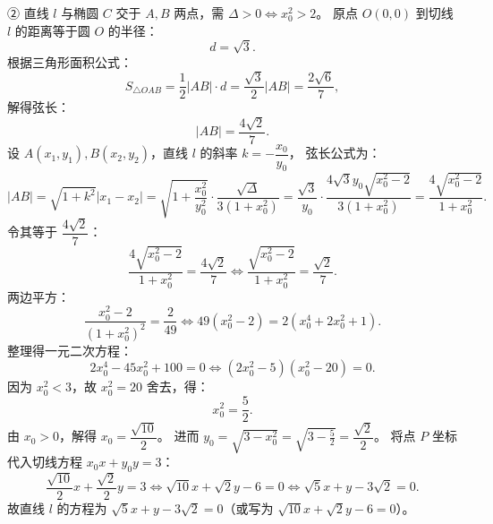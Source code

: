 \begin{answer}
② 直线 $l$ 与椭圆 $C$ 交于 $A, B$ 两点，需 $\Delta > 0 \iff x_0^2 > 2$。
原点 $O(0, 0)$ 到切线 $l$ 的距离等于圆 $O$ 的半径：
\nopagebreak[4]
\[d = \sqrt{3}.\]
根据三角形面积公式：
\nopagebreak[4]
\[S_{\triangle OAB} = \frac{1}{2} |AB| \cdot d = \frac{\sqrt{3}}{2} |AB| = \frac{2\sqrt{6}}{7},\]
解得弦长：
\nopagebreak[4]
\[|AB| = \frac{4\sqrt{2}}{7}.\]
设 $A(x_1, y_1), B(x_2, y_2)$，直线 $l$ 的斜率 $k = -\dfrac{x_0}{y_0}$，
弦长公式为：
\nopagebreak[4]
\[|AB| = \sqrt{1 + k^2} |x_1 - x_2| = \sqrt{1 + \frac{x_0^2}{y_0^2}} \cdot \frac{\sqrt{\Delta}}{3(1 + x_0^2)} = \frac{\sqrt{3}}{y_0} \cdot \frac{4\sqrt{3}y_0\sqrt{x_0^2 - 2}}{3(1 + x_0^2)} = \frac{4\sqrt{x_0^2 - 2}}{1 + x_0^2}.\]
令其等于 $\dfrac{4\sqrt{2}}{7}$：
\nopagebreak[4]
\[\frac{4\sqrt{x_0^2 - 2}}{1 + x_0^2} = \frac{4\sqrt{2}}{7} \iff \frac{\sqrt{x_0^2 - 2}}{1 + x_0^2} = \frac{\sqrt{2}}{7}.\]
两边平方：
\nopagebreak[4]
\[\frac{x_0^2 - 2}{(1 + x_0^2)^2} = \frac{2}{49} \iff 49(x_0^2 - 2) = 2(x_0^4 + 2x_0^2 + 1).\]
整理得一元二次方程：
\nopagebreak[4]
\[2x_0^4 - 45x_0^2 + 100 = 0 \iff (2x_0^2 - 5)(x_0^2 - 20) = 0.\]
因为 $x_0^2 < 3$，故 $x_0^2 = 20$ 舍去，得：
\nopagebreak[4]
\[x_0^2 = \frac{5}{2}.\]
由 $x_0 > 0$，解得 $x_0 = \dfrac{\sqrt{10}}{2}$。
进而 $y_0 = \sqrt{3 - x_0^2} = \sqrt{3 - \frac{5}{2}} = \dfrac{\sqrt{2}}{2}$。
将点 $P$ 坐标代入切线方程 $x_0 x + y_0 y = 3$：
\nopagebreak[4]
\[\frac{\sqrt{10}}{2}x + \frac{\sqrt{2}}{2}y = 3 \iff \sqrt{10}x + \sqrt{2}y - 6 = 0 \iff \sqrt{5}x + y - 3\sqrt{2} = 0.\]
故直线 $l$ 的方程为 $\sqrt{5}x + y - 3\sqrt{2} = 0$（或写为 $\sqrt{10}x + \sqrt{2}y - 6 = 0$）。



\end{answer}
